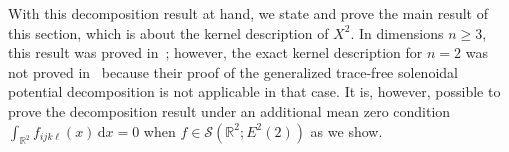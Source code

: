 \documentclass[11pt]{article}
\newcommand{\abs}[1]{\lvert #1 \rvert}
\newcommand{\Rb}{\mathbb{R}}
\newcommand{\sch}{\mathcal{S}}
\renewcommand{\d}{\mathrm{d}}
\newcommand{\qum}[1]{\quad\mbox{#1}}
\begin{document}

With this decomposition result at hand, we state and prove the main result of this section, which is about the kernel description of $X^2$. In dimensions $n\ge 3$, this result was proved in~\cite{ilmavirta2025elasticraytransform}; however, the exact kernel description for $n=2$ was not proved in~\cite{ilmavirta2025elasticraytransform} because their proof of the generalized trace-free solenoidal potential decomposition is not applicable in that case.
It is, however, possible to prove the decomposition result under an additional mean zero condition $\int_{\Rb^2} f_{ijk\ell}(x) \,\d x=0$ when $f\in \sch(\mathbb{R}^2;E^2(2))$ as we show.
\end{document}
